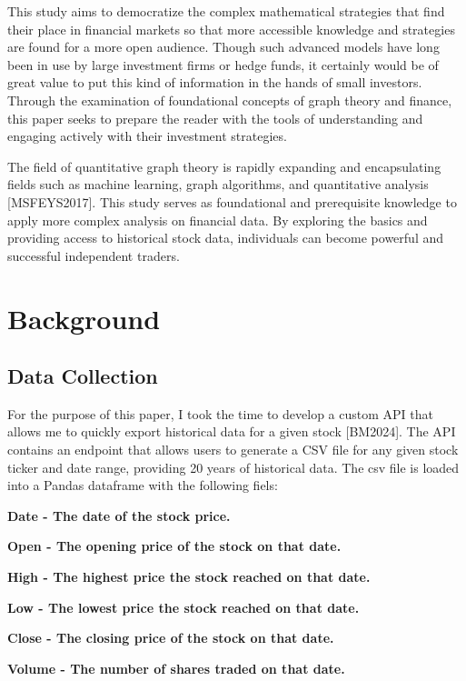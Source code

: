 \documentclass{article}
\begin{document}
This study aims to democratize the complex mathematical strategies that find their place in financial markets so that more accessible knowledge and strategies are found for a more open audience. Though such advanced models have long been in use by large investment firms or hedge funds, it certainly would be of great value to put this kind of information in the hands of small investors. Through the examination of foundational concepts of graph theory and finance, this paper seeks to prepare the reader with the tools of understanding and engaging actively with their investment strategies.

The field of quantitative graph theory is rapidly expanding and encapsulating fields such as machine learning, graph algorithms, and quantitative analysis [MSFEYS2017]. This study serves as foundational and prerequisite knowledge to apply more complex analysis on financial data. By exploring the basics and providing  access to historical stock data, individuals can become powerful and successful independent traders.


\section{Background}

\subsection{Data Collection}

For the purpose of this paper, I took the time to develop a custom API that allows me to quickly export historical data for a given stock [BM2024]. The API contains an endpoint that allows users to generate a CSV file for any given stock ticker and date range, providing 20 years of historical data. The csv file is loaded into a Pandas dataframe with the following fiels:

\begin{compactitem}
    \item \bf{Date} - The date of the stock price. 
    \item \bf{Open} - The opening price of the stock on that date.
    \item \bf{High} - The highest price the stock reached on that date.
    \item \bf{Low} - The lowest price the stock reached on that date.
    \item \bf{Close} - The closing price of the stock on that date.
    \item \bf{Volume} - The number of shares traded on that date.
\end{compactitem}
\end{document}
